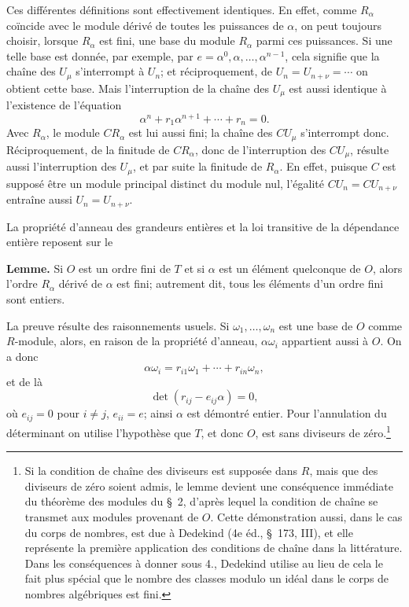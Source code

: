 Ces différentes définitions sont effectivement identiques. En effet, comme $R_\alpha$ coïncide avec le module dérivé de toutes les puissances de $\alpha$, on peut toujours choisir, lorsque $R_\alpha$ est fini, une base du module $R_\alpha$ parmi ces puissances. Si une telle base est donnée, par exemple, par $e=\alpha^0,\alpha,\ldots,\alpha^{n-1}$, cela signifie que la chaîne des $U_\mu$ s'interrompt à $U_n$; et réciproquement, de $U_n=U_{n+\nu}=\cdots$ on obtient cette base. Mais l'interruption de la chaîne des $U_\mu$ est aussi identique à l'existence de l'équation
\[
        \alpha^n+r_1\alpha^{n+1}+\cdots+r_n=0.
\]
Avec $R_\alpha$, le module $CR_\alpha$ est lui aussi fini; la chaîne des $CU_\mu$ s'interrompt donc. Réciproquement, de la finitude de $CR_\alpha$, donc de l'interruption des $CU_\mu$, résulte aussi l'interruption des $U_\mu$, et par suite la finitude de $R_\alpha$. En effet, puisque $C$ est supposé être un module principal distinct du module nul, l'égalité $CU_n=CU_{n+\nu}$ entraîne aussi $U_n=U_{n+\nu}$.

La propriété d'anneau des grandeurs entières et la loi transitive de la dépendance entière reposent sur le

\medskip
\noindent\textbf{Lemme.} Si $O$ est un ordre fini de $T$ et si $\alpha$ est un élément quelconque de $O$, alors l'ordre $R_\alpha$ dérivé de $\alpha$ est fini; autrement dit, tous les éléments d'un ordre fini sont entiers.

La preuve résulte des raisonnements usuels. Si $\omega_1,\ldots,\omega_n$ est une base de $O$ comme $R$-module, alors, en raison de la propriété d'anneau, $\alpha\omega_i$ appartient aussi à $O$. On a donc
\[
        \alpha\omega_i=r_{i1}\omega_1+\cdots+r_{in}\omega_n,
\]
et de là
\[
        \det(r_{ij}-e_{ij}\alpha)=0,
\]
où $e_{ij}=0$ pour $i\ne j$, $e_{ii}=e$; ainsi $\alpha$ est démontré entier. Pour l'annulation du déterminant on utilise l'hypothèse que $T$, et donc $O$, est sans diviseurs de zéro.\footnote{Si la condition de chaîne des diviseurs est supposée dans $R$, mais que des diviseurs de zéro soient admis, le lemme devient une conséquence immédiate du théorème des modules du \S~2, d'après lequel la condition de chaîne se transmet aux modules provenant de $O$. Cette démonstration aussi, dans le cas du corps de nombres, est due à Dedekind (4e éd., \S~173, III), et elle représente la première application des conditions de chaîne dans la littérature. Dans les conséquences à donner sous 4., Dedekind utilise au lieu de cela le fait plus spécial que le nombre des classes modulo un idéal dans le corps de nombres algébriques est fini.}

